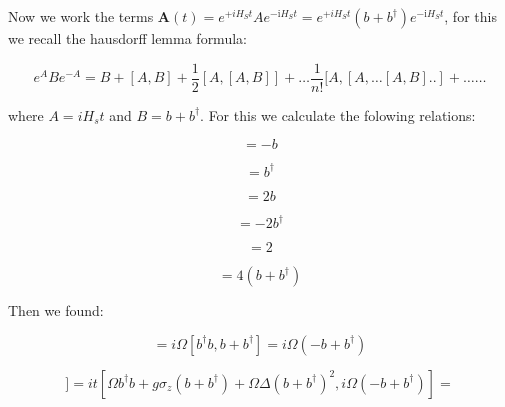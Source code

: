 \documentclass[reprint,aps,onecolumn,pra,notitlepage,nofootinbib]{revtex4-1}
\theoremstyle{definition}
\numberwithin{equation}{section}
\begin{document}


Now we work the terms $\boldsymbol{A}(t) = e^{+i H_{S} t} A e^{-\mathrm{i} H_{S} t} = e^{+i H_{S} t} (b+b^{\dagger}) e^{-\mathrm{i} H_{S} t} $, for this we recall the hausdorff lemma formula:


\begin{equation}
\left.e^{A} B e^{-A}=B+[A, B]+\frac{1}{2}[A,[A, B]]+\ldots \frac{1}{n !}[A,[A, \ldots[A, B] . .]+\ldots \ldots
\end{equation}

where $A= i H_s t $ and $B= b+b^{\dagger} $. For this we calculate the folowing relations: 

\begin{equation}
    [ b^{\dagger}b ,    b   ] = -b 
\end{equation}

\begin{equation}
    [ b^{\dagger}b ,    b ^{\dagger}  ] = b ^{\dagger} 
\end{equation}




\begin{equation}
    [ bb ,    b ^{\dagger}  ] = 2b 
\end{equation}


\begin{equation}
    [ b^{\dagger}b^{\dagger} ,    b  ] = -2b^{\dagger} 
\end{equation}

\begin{equation}
    [  b+ b^{\dagger}  ,  -b+ b^{\dagger}   ] = 2
\end{equation}

\begin{equation}
    [ \left( b+ b^{\dagger} \right)^2 , \left( -b+ b^{\dagger} \right)  ] = 4\left( b+ b^{\dagger} \right) 
\end{equation}


Then we found:

\begin{equation}
[A, B] = i \Omega [ b^{\dagger}b , b+b^{\dagger}  ] = i \Omega  \left( -b+b^{\dagger}  \right)  
\end{equation}

\begin{equation}
[A,[A, B]]= i  t [  \Omega b^{\dagger}b + g \sigma_z (b+b^{\dagger})  + \Omega \Delta \left( b+ b^{\dagger} \right)^2  , i \Omega  \left( -b+b^{\dagger}  \right)  ] = 
\end{equation}
\end{document}

